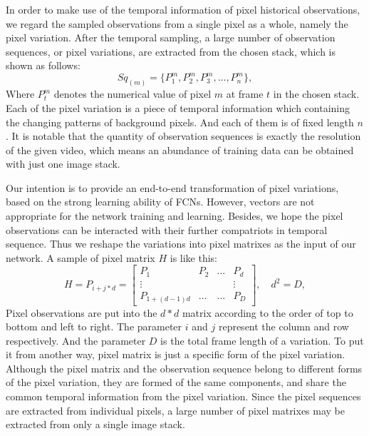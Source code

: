 \documentclass[runningheads,a4paper]{llncs}
\begin{document}
In order to make use of the temporal information of pixel historical observations, we regard the sampled observations from a single pixel as a whole, namely the pixel variation. After the temporal sampling, a large number of observation sequences, or pixel variations, are extracted from the chosen stack, which is shown as follows:
\begin{equation}
Sq_{(m)}=\{P_1^m,P_2^m,P_3^m,\dots,P_n^m\},
\end{equation}
Where $P_t^m$ denotes the numerical value of pixel $m$ at frame $t$ in the chosen stack. Each of the pixel variation is a piece of temporal information which containing the changing patterns of background pixels. And each of them is of fixed length $n$. It is notable that the quantity of observation sequences is exactly the resolution of the given video, which means an abundance of training data can be obtained with just one image stack. 

Our intention is to provide an end-to-end transformation of pixel variations, based on the strong learning ability of FCNs. However, vectors are not appropriate for the network training and learning. Besides, we hope the pixel observations can be interacted with their further compatriots in temporal sequence. Thus we reshape the variations into pixel matrixes as the input of our network. A sample of pixel matrix $H$ is like this:
\begin{equation}
H=P_{i+j*d}=\begin{bmatrix}
 P_1& P_2  &\dots  &P_d \\ 
\vdots &  &  &\vdots \\ 
 P_{1+(d-1)d}& \dots & \dots & P_D
\end{bmatrix},\quad d^2=D,
\end{equation}
Pixel observations are put into the $d*d$ matrix according to the order of top to bottom and left to right. The parameter $i$ and $j$ represent the column and row respectively. And the parameter $D$ is the total frame length of a variation. To put it from another way, pixel matrix is just a specific form of the pixel variation. Although the pixel matrix and the observation sequence belong to different forms of the pixel variation, they are formed of the same components, and share the common temporal information from the pixel variation. Since the pixel sequences are extracted from individual pixels, a large number of pixel matrixes may be extracted from only a single image stack.
\end{document}

